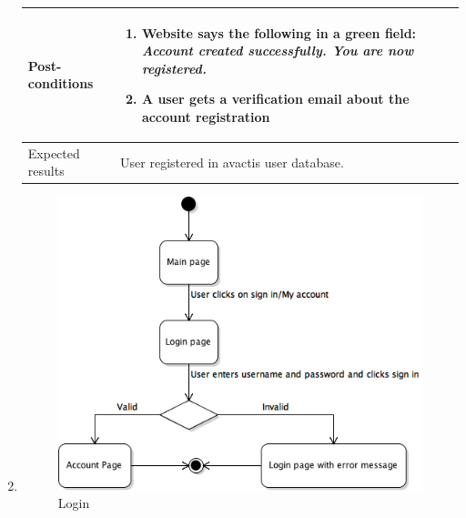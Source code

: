 \documentclass[UKenglish,12pt]{article}
\begin{document}
\begin{enumerate}
\begin{tabular}{| p{5cm} | p{10cm} | }
	 Post-conditions & \begin{enumerate} \item Website says the following in a green field: \textit{Account created successfully. You are now registered.} \item A user gets a verification email about the account registration\end{enumerate}\\ \hline
	 Expected results & User registered in avactis user database.\\ 
	 \hline
\end{tabular} %

\item
\begin{figure}[!h]
\centering
\includegraphics[scale=0.7,keepaspectratio]{Images/Login.png}
\caption{Login}
\end{figure}


\end{enumerate}
\end{document}

